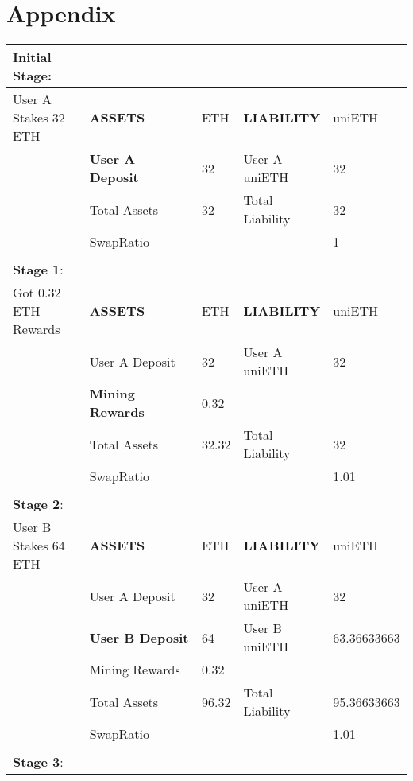 \documentclass{article}
\begin{document}
\section{Appendix}
\begin{table}[!ht]
    \centering
    \begin{tabular}{p{0.2\linewidth} | p{0.3\linewidth}| p{0.1\linewidth}| p{0.2\linewidth}| p{0.2\linewidth}}
    \hline
        \textbf{Initial Stage}:  & ~ & ~ & ~ & ~ \\ \hline
        User A Stakes 32 ETH & \textbf{ASSETS} & ETH & \textbf{LIABILITY} & uniETH \\ \hline
        ~ & \textbf{User A Deposit} & 32 & User A uniETH & 32 \\ \hline
        ~ & Total Assets & 32 & Total Liability & 32 \\ \hline
        ~ & SwapRatio & ~ & ~ & 1 \\ \hline
        \multicolumn{5}{c}{} \\ \hline
        \textbf{Stage 1}:  & ~ & ~ & ~ & ~ \\ \hline
        Got 0.32 ETH Rewards & \textbf{ASSETS} & ETH & \textbf{LIABILITY} & uniETH \\ \hline
        ~ & User A Deposit & 32 & User A uniETH & 32 \\ \hline
        ~ & \textbf{Mining Rewards} & 0.32 & ~ & ~ \\ \hline
        ~ & Total Assets & 32.32 & Total Liability & 32 \\ \hline
        ~ & SwapRatio & ~ & ~ & 1.01 \\ \hline
        \multicolumn{5}{c}{} \\ \hline
        \textbf{Stage 2}:  & ~ & ~ & ~ & ~ \\ \hline
        User B Stakes 64 ETH & \textbf{ASSETS} & ETH & \textbf{LIABILITY} & uniETH \\ \hline
        ~ & User A Deposit & 32 & User A uniETH & 32 \\ \hline
        ~ & \textbf{User B Deposit} & 64 & User B uniETH & 63.36633663 \\ \hline
        ~ & Mining Rewards & 0.32 & ~ & ~ \\ \hline
        ~ & Total Assets & 96.32 & Total Liability & 95.36633663 \\ \hline
        ~ & SwapRatio & ~ & ~ & 1.01 \\ \hline
        \multicolumn{5}{c}{} \\ \hline
        \textbf{Stage 3}: & ~ & ~ & ~ & ~ \\ \hline

\end{tabular}
\end{table}
\end{document}
